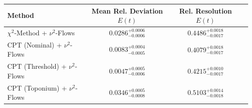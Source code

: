     \begin{tabular}{lccc}
        \toprule
        Method & Mean Rel. Deviation $E(t)$ & Rel. Resolution $E(t)$ \\
        \midrule
        $\chi^2$-Method + $\nu^2$-Flows & $0.0286^{+0.0006}_{-0.0006}$ & $0.4486^{+0.0018}_{-0.0017}$ \\
        CPT (Nominal) + $\nu^2$-Flows & $0.0083^{+0.0004}_{-0.0005}$ & $0.4079^{+0.0018}_{-0.0017}$ \\
        CPT (Threshold) + $\nu^2$-Flows & $0.0047^{+0.0005}_{-0.0006}$ & $0.4215^{+0.0010}_{-0.0017}$ \\
        CPT (Toponium) + $\nu^2$-Flows & $0.0346^{+0.0005}_{-0.0008}$ & $0.5103^{+0.0014}_{-0.0018}$ \\
        \bottomrule
    \end{tabular}